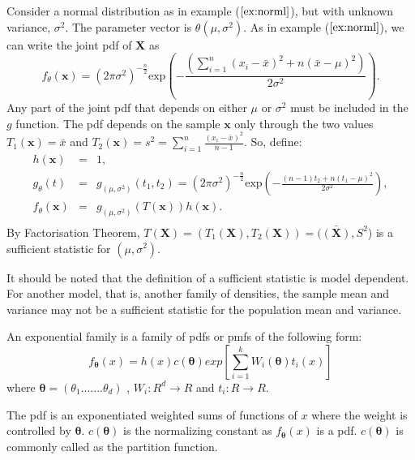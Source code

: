 \documentclass[a4paper,english,12pt]{article}
\newcommand{\bx}{\mathbf{x}}
\newcommand{\bX}{\mathbf{X}}
\newcommand{\btheta}{\boldsymbol{\theta}}
\begin{document}
\begin{exmp}
Consider a normal distribution as in example ($\ref{ex:norml}$), but with unknown variance, $\sigma^2$. The parameter vector is $\theta(\mu,\sigma^2)$. As in example ($\ref{ex:norml}$), we can write the joint pdf of $\bX$ as
\begin{equation}
f_\theta(\bx) = (2\pi\sigma^2)^{-\frac{n}{2}}\text{exp}\left(-\frac{\left(\sum_{i=1}^{n}{(x_i-\bar{x})^2}+n(\bar{x}-\mu)^2\right)}{2\sigma^2}\right). 
\end{equation}
Any part of the joint pdf that depends on either $\mu$ or $\sigma^2$ must be included in the $g$ function. The pdf depends on the sample $\bx$ only through the two values $T_1(\bx) = \bar{x}$ and $T_2(\bx) = s^2= \sum_{i=1}^{n}{\frac{(x_i-\bar{x})^2}{n-1}}$.
So, define:
\begin{eqnarray}
h(\bx)&=& 1,	\nonumber \\
g_\theta(t) &=& g_{(\mu,\sigma^2)}(t_1,t_2)=(2\pi\sigma^2)^{-\frac{n}{2}}\text{exp}\left(-\frac{(n-1)t_2+n(t_1-\mu)^2}{2\sigma^2}\right),\nonumber \\
f_\theta(\bx) &=& g_{(\mu,\sigma^2)}(T(\bx))h(\bx). \nonumber \\
\end{eqnarray}
By Factorisation Theorem, $T(\bX)=(T_1(\bX),T_2(\bX)) = (\bar{(\bX)},S^2$) is a sufficient statistic for $(\mu,\sigma^2)$.

It should be noted that the definition of a sufficient statistic is model dependent. For another model, that is, another family of densities, the sample mean and variance may not be a sufficient statistic for the population mean and variance.

\end{exmp}

\begin{defn}
An exponential family is a family of pdfs or pmfs of the following form:
\begin{equation} \label{eq:exppdf}
f_{\btheta}(x) = h(x)c(\btheta)exp[\sum_{i=1}^{k} W_i(\btheta)t_i(x)]  
\end{equation}
where $\btheta = (\theta_1 ....... \theta_d)$ , $W_i:R^d\rightarrow R$ and $t_i:R\rightarrow R$.
\end{defn}
 The pdf is an exponentiated weighted sums of functions of $x$ where the weight is controlled by $\btheta$. $c(\btheta)$ is the normalizing constant as $f_{\btheta}(x)$ is a pdf. $c(\btheta)$ is commonly called as the partition function.
\end{document}
